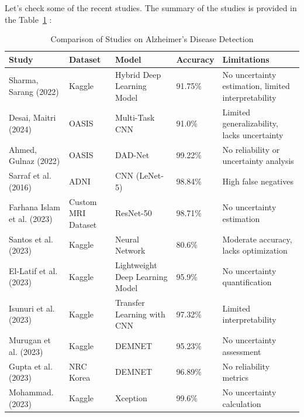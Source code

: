\documentclass[12pt,onecolumn]{report}
\begin{document}
Let's check some of the recent studies. The summary of the studies is provided in the Table~\ref{tab:methods_comparison} :
\begin{table}[h!]
    \centering
    \caption{Comparison of Studies on Alzheimer’s Disease Detection}
    \label{tab:methods_comparison}
    \begin{tabular}{|p{3cm}|p{3cm}|p{3cm}|p{2cm}|p{4cm}|}
        \hline
        \textbf{Study} & \textbf{Dataset} & \textbf{Model} & \textbf{Accuracy} & \textbf{Limitations} \\ \hline
        Sharma, Sarang (2022) \cite{2022Sarang} & Kaggle & Hybrid Deep Learning Model & 91.75\% & No uncertainty estimation, limited interpretability \\ \hline
        Desai, Maitri (2024) \cite{2024Desai} & OASIS & Multi-Task CNN & 91.0\% & Limited generalizability, lacks uncertainty \\ \hline
        Ahmed, Gulnaz (2022) \cite{2022Ahmed} & OASIS & DAD-Net & 99.22\% & No reliability or uncertainty analysis \\ \hline
        Sarraf et al. (2016) \cite{sarraf2016} & ADNI & CNN (LeNet-5) & 98.84\% & High false negatives \\ \hline
        Farhana Islam et al. (2023) \cite{Islam2023} & Custom MRI Dataset & ResNet-50 & 98.71\% & No uncertainty estimation \\ \hline
        Santos et al. (2023)  \cite{Santos2023} & Kaggle & Neural Network & 80.6\% & Moderate accuracy, lacks optimization \\ \hline
        El-Latif et al. (2023) \cite{Latif2023} & Kaggle & Lightweight Deep Learning Model & 95.9\% & No uncertainty quantification \\ \hline
        Isunuri et al. (2023) \cite{Isunuri2023} & Kaggle & Transfer Learning with CNN & 97.32\% & Limited interpretability \\ \hline
        Murugan et al. (2023) \cite{Murugan2021} & Kaggle & DEMNET & 95.23\% & No uncertainty assessment \\ \hline
        Gupta et al. (2023) \cite{Gupta2019} & NRC Korea & DEMNET & 96.89\% & No reliability metrics \\ \hline
        Mohammad. (2023) \cite{Gupta2019} & Kaggle & Xception & 99.6\% & No uncertainty calculation \\ \hline
    \end{tabular}
\end{table}
\end{document}
